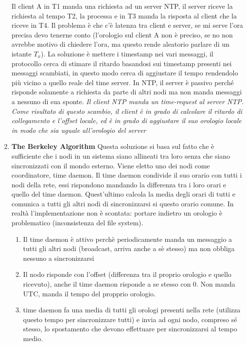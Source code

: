 \documentclass[12pt,italian]{report}
\begin{document}
\begin{enumerate}
    Il client A in T1 manda una richiesta ad un server NTP, il server riceve la richiesta al tempo T2, la processa e in T3 manda la risposta al client che la riceve in T4. Il problema è che c'è latenza tra client e server, se mi serve l'ora precisa devo tenerne conto (l'orologio sul client A non è preciso, se no non avrebbe motivo di chiedere l'ora, ma questo rende aleatorio parlare di un istante $T_x$). La soluzione è mettere i timestamp nei vari messaggi, il protocollo cerca di stimare il ritardo basandosi sui timestamp presenti nei messaggi scambiati, in questo modo cerca di aggiustare il tempo rendendolo più vicino a quello reale del time server. In NTP, il server è passivo perché risponde solamente a richiesta da parte di altri nodi ma non manda messaggi a nessuno di sua sponte.
    \bigbreak
    \textit{Il client NTP manda un time-request al server NTP. Come risultato di questo scambio, il client è in grado di calcolare il ritardo di collegamento e l'offset locale, ed è in grado di aggiustare il suo orologio locale in modo che sia uguale all'orologio del server}

    \item \textbf{The Berkeley Algorithm} 
    \bigbreak
    Questa soluzione si basa sul fatto che è sufficiente che i nodi in un sistema siano allineati tra loro senza che siano sincronizzati con il mondo esterno. Viene eletto uno dei nodi come coordinatore, time daemon. Il time daemon condivide il suo orario con tutti i nodi della rete, essi rispondono mandando la differenza tra i loro orari e quello del time daemon. Quest'ultimo calcola la media degli orari di tutti e comunica a tutti gli altri nodi di sincronizzarsi si questo orario comune. In realtà l'implementazione non è scontata: portare indietro un orologio è problematico (inconsistenza del file system).
    
    \begin{enumerate}
        \item Il time daemon è attivo perchè periodicamente manda un messaggio a tutti gli altri nodi (broadcast, arriva anche a sè stesso) ma non obbliga nessuno a sincronizzarsi
        \item Il nodo risponde con l'offset (differenza tra il proprio orologio e quello ricevuto), anche il time daemon risponde a se stesso con 0. Non manda UTC, manda il tempo del propprio orologio. 
        \item time daemon fa una media di tutti gli orologi presenti nella rete (utilizza questo tempo per sincronizzare tutti) e invia ad ogni nodo, compreso sé stesso, lo spostamento che devono effettuare per sincronizzarsi al tempo medio. 
    \end{enumerate}
\end{enumerate}    
\end{document}
